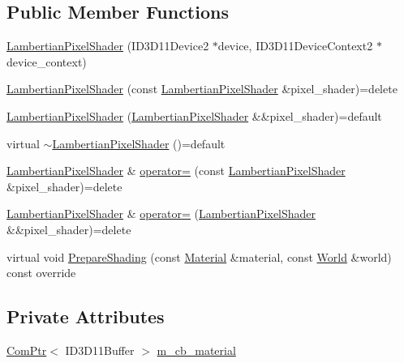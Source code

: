 \subsection*{Public Member Functions}
\begin{DoxyCompactItemize}
\item 
\hyperlink{classmage_1_1_lambertian_pixel_shader_a5f16778caf62403d148bf5edee042935}{Lambertian\+Pixel\+Shader} (I\+D3\+D11\+Device2 $\ast$device, I\+D3\+D11\+Device\+Context2 $\ast$device\+\_\+context)
\item 
\hyperlink{classmage_1_1_lambertian_pixel_shader_a0e7a36645bb7e1fa9bd481575886ddad}{Lambertian\+Pixel\+Shader} (const \hyperlink{classmage_1_1_lambertian_pixel_shader}{Lambertian\+Pixel\+Shader} \&pixel\+\_\+shader)=delete
\item 
\hyperlink{classmage_1_1_lambertian_pixel_shader_aadcfc17f23e4a2604703c153d8b411b8}{Lambertian\+Pixel\+Shader} (\hyperlink{classmage_1_1_lambertian_pixel_shader}{Lambertian\+Pixel\+Shader} \&\&pixel\+\_\+shader)=default
\item 
virtual \hyperlink{classmage_1_1_lambertian_pixel_shader_aedea7342ae95c6532a086fb28978b5b0}{$\sim$\+Lambertian\+Pixel\+Shader} ()=default
\item 
\hyperlink{classmage_1_1_lambertian_pixel_shader}{Lambertian\+Pixel\+Shader} \& \hyperlink{classmage_1_1_lambertian_pixel_shader_a03ae64ef13e62b33c6b6ac306207a045}{operator=} (const \hyperlink{classmage_1_1_lambertian_pixel_shader}{Lambertian\+Pixel\+Shader} \&pixel\+\_\+shader)=delete
\item 
\hyperlink{classmage_1_1_lambertian_pixel_shader}{Lambertian\+Pixel\+Shader} \& \hyperlink{classmage_1_1_lambertian_pixel_shader_af3fd77b32ff54a932b9c8734446cd5bd}{operator=} (\hyperlink{classmage_1_1_lambertian_pixel_shader}{Lambertian\+Pixel\+Shader} \&\&pixel\+\_\+shader)=delete
\item 
virtual void \hyperlink{classmage_1_1_lambertian_pixel_shader_aa7fe16f197ee09c60f6416f1d5178671}{Prepare\+Shading} (const \hyperlink{structmage_1_1_material}{Material} \&material, const \hyperlink{classmage_1_1_world}{World} \&world) const override
\end{DoxyCompactItemize}
\subsection*{Private Attributes}
\begin{DoxyCompactItemize}
\item 
\hyperlink{namespacemage_ae74f374780900893caa5555d1031fd79}{Com\+Ptr}$<$ I\+D3\+D11\+Buffer $>$ \hyperlink{classmage_1_1_lambertian_pixel_shader_aff89982b5f85531515ec2316930b2944}{m\+\_\+cb\+\_\+material}
\end{DoxyCompactItemize}
